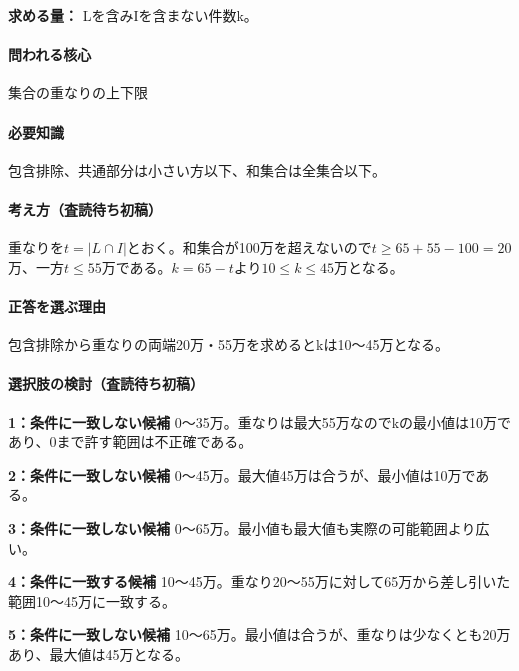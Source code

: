 \noindent\textbf{求める量：} Lを含みIを含まない件数k。\par

\paragraph{問われる核心} 集合の重なりの上下限

\paragraph{必要知識} 包含排除、共通部分は小さい方以下、和集合は全集合以下。

\paragraph{考え方（査読待ち初稿）} 重なりを\(t=|L\cap I|\)とおく。和集合が100万を超えないので\(t\ge65+55-100=20\)万、一方\(t\le55\)万である。\(k=65-t\)より\(10\le k\le45\)万となる。

\paragraph{正答を選ぶ理由} 包含排除から重なりの両端20万・55万を求めるとkは10〜45万となる。

\paragraph{選択肢の検討（査読待ち初稿）}\mbox{}\par

\noindent\textbf{1：条件に一致しない候補} 0〜35万。重なりは最大55万なのでkの最小値は10万であり、0まで許す範囲は不正確である。\par

\noindent\textbf{2：条件に一致しない候補} 0〜45万。最大値45万は合うが、最小値は10万である。\par

\noindent\textbf{3：条件に一致しない候補} 0〜65万。最小値も最大値も実際の可能範囲より広い。\par

\noindent\textbf{4：条件に一致する候補} 10〜45万。重なり20〜55万に対して65万から差し引いた範囲10〜45万に一致する。\par

\noindent\textbf{5：条件に一致しない候補} 10〜65万。最小値は合うが、重なりは少なくとも20万あり、最大値は45万となる。\par

